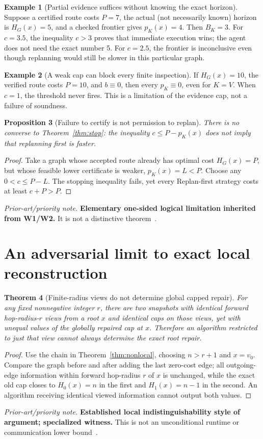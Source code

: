 \documentclass[11pt,letterpaper]{article}
\newtheorem{theorem}{Theorem}[section]
\newtheorem{proposition}[theorem]{Proposition}
\theoremstyle{definition}
\newtheorem{example}[theorem]{Example}
\theoremstyle{remark}
\newcommand{\novel}[1]{\par\begingroup\small\textit{Prior-art/priority note.} #1\par\endgroup}
\begin{document}
\begin{example}[Partial evidence suffices without knowing the exact horizon]
Suppose a certified route costs \(P=7\), the actual (not necessarily known) horizon is \(H_G(x)=5\), and a checked frontier gives \(p_K(x)=4\). Then \(B_K=3\). For \(c=3.5\), the inequality \(c>3\) proves that immediate execution wins; the agent does not need the exact number 5. For \(c=2.5\), the frontier is inconclusive even though replanning would still be slower in this particular graph.
\end{example}
\begin{example}[A weak cap can block every finite inspection]
If \(H_G(x)=10\), the verified route costs \(P=10\), and \(b\equiv0\), then every \(p_K\equiv0\), even for \(K=V\). When \(c=1\), the threshold never fires. This is a limitation of the evidence cap, not a failure of soundness.
\end{example}
\begin{proposition}[Failure to certify is not permission to replan]\label{prop:nonconverse}
There is no converse to Theorem~\ref{thm:stop}: the inequality \(c\le P-p_K(x)\) does not imply that replanning first is faster.
\end{proposition}
\begin{proof}
Take a graph whose accepted route already has optimal cost \(H_G(x)=P\), but whose feasible lower certificate is weaker, \(p_K(x)=L<P\). Choose any \(0<c\le P-L\). The stopping inequality fails, yet every Replan-first strategy costs at least \(c+P>P\).
\end{proof}
\novel{\textbf{Elementary one-sided logical limitation inherited from W1/W2.} It is not a distinctive theorem~\cite{W1,Russell1991}.}

\section{An adversarial limit to exact local reconstruction}
\begin{theorem}[Finite-radius views do not determine global capped repair]\label{thm:radius}
For any fixed nonnegative integer \(r\), there are two snapshots with identical forward hop-radius-\(r\) views from a root \(x\) and identical caps on those views, yet with unequal values of the globally repaired cap at \(x\). Therefore an algorithm restricted to just that view cannot always determine the exact root repair.
\end{theorem}
\begin{proof}
Use the chain in Theorem~\ref{thm:nonlocal}, choosing \(n>r+1\) and \(x=v_0\). Compare the graph before and after adding the last zero-cost edge; all outgoing-edge information within forward hop-radius \(r\) of \(x\) is unchanged, while the exact old cap closes to \(H_0(x)=n\) in the first and \(H_1(x)=n-1\) in the second. An algorithm receiving identical viewed information cannot output both values.
\end{proof}
\novel{\textbf{Established local indistinguishability style of argument; specialized witness.} This is not an unconditional runtime or communication lower bound~\cite{Roditty2004,Ramalingam1996,W2}.}
\end{document}
